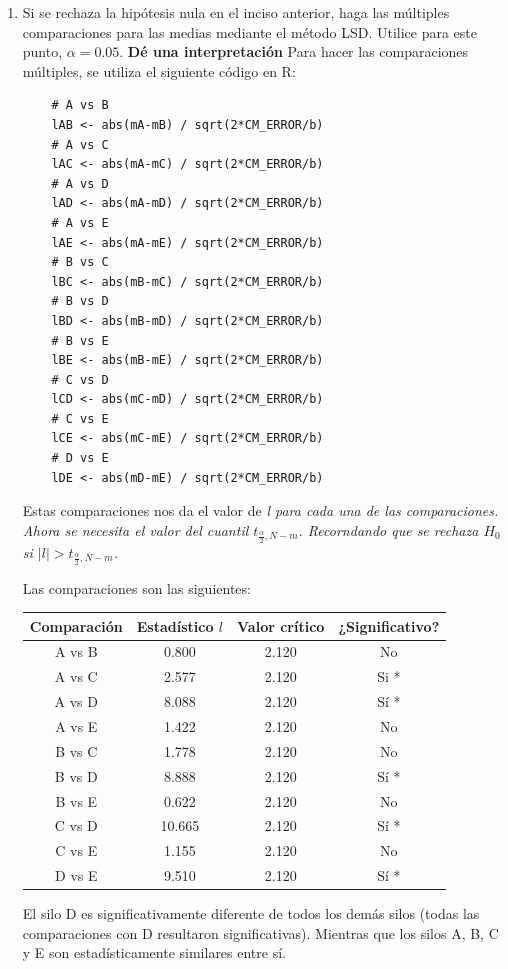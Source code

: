 \documentclass[12pt,a4paper]{article}
\begin{document}
\begin{enumerate}
  \item Si se rechaza la hipótesis nula en el inciso anterior, haga las múltiples comparaciones para las medias mediante el método LSD. Utilice para este punto, \(\alpha=0.05\). \textbf{Dé una interpretación}
  Para hacer las comparaciones múltiples, se utiliza el siguiente código en R:
  \begin{lstlisting}
    # A vs B 
    lAB <- abs(mA-mB) / sqrt(2*CM_ERROR/b)
    # A vs C
    lAC <- abs(mA-mC) / sqrt(2*CM_ERROR/b)
    # A vs D
    lAD <- abs(mA-mD) / sqrt(2*CM_ERROR/b)
    # A vs E
    lAE <- abs(mA-mE) / sqrt(2*CM_ERROR/b)
    # B vs C
    lBC <- abs(mB-mC) / sqrt(2*CM_ERROR/b)
    # B vs D
    lBD <- abs(mB-mD) / sqrt(2*CM_ERROR/b)
    # B vs E
    lBE <- abs(mB-mE) / sqrt(2*CM_ERROR/b)
    # C vs D
    lCD <- abs(mC-mD) / sqrt(2*CM_ERROR/b)
    # C vs E
    lCE <- abs(mC-mE) / sqrt(2*CM_ERROR/b)
    # D vs E
    lDE <- abs(mD-mE) / sqrt(2*CM_ERROR/b)
  \end{lstlisting}
  Estas comparaciones nos da el valor de \it{l} para cada una de las comparaciones. Ahora se necesita el valor del cuantil \( t_{\frac{\alpha}{2},N-m} \). Recorndando que se rechaza \(H_0\) si \(|l| > t_{\frac{\alpha}{2},N-m}\).

  Las comparaciones son las siguientes:
  \begin{table}[H]
  \centering
  \begin{tabular}{|c|c|c|c|}
    \hline
    \textbf{Comparación} & \textbf{Estadístico } $l$ & \textbf{Valor crítico} & \textbf{¿Significativo?} \\ \hline
    A vs B & 0.800 & 2.120 & No \\ 
    A vs C & 2.577 & 2.120 & Si * \\ 
    A vs D & 8.088 & 2.120 & Sí * \\ 
    A vs E & 1.422 & 2.120 & No \\ 
    B vs C & 1.778 & 2.120 & No \\ 
    B vs D & 8.888 & 2.120 & Sí * \\ 
    B vs E & 0.622 & 2.120 & No \\ 
    C vs D & 10.665 & 2.120 & Sí * \\ 
    C vs E & 1.155 & 2.120 & No \\ 
    D vs E & 9.510 & 2.120 & Sí * \\ \bottomrule
  \end{tabular}
  \end{table}
  El silo D es significativamente diferente de todos los demás silos (todas las comparaciones con D resultaron significativas). Mientras que los silos A, B, C y E son estadísticamente similares entre sí.


\end{enumerate}
\end{document}
